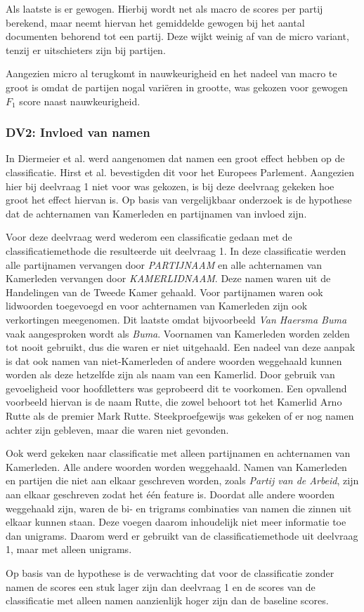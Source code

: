 Als laatste is er gewogen. Hierbij wordt net als macro de scores per partij berekend, maar neemt hiervan het gemiddelde gewogen bij het aantal documenten behorend tot een partij. Deze wijkt weinig af van de micro variant, tenzij er uitschieters zijn bij partijen.\par
Aangezien micro al terugkomt in nauwkeurigheid en het nadeel van macro te groot is omdat de partijen nogal variëren in grootte, was gekozen voor gewogen $F_1$ score naast nauwkeurigheid.

\subsubsection{DV2: Invloed van namen}
In Diermeier et al. \cite{diermeier_godbout_yu_kaufmann_2012} werd aangenomen dat namen een groot effect hebben op de classificatie. Hirst et al. \cite{Hirst_textto} bevestigden dit voor het Europees Parlement. Aangezien hier bij deelvraag 1 niet voor was gekozen, is bij deze deelvraag gekeken hoe groot het effect hiervan is. Op basis van vergelijkbaar onderzoek is de hypothese dat de achternamen van Kamerleden en partijnamen van invloed zijn.\par
Voor deze deelvraag werd wederom een classificatie gedaan met de classificatiemethode die resulteerde uit deelvraag 1. In deze classificatie werden alle partijnamen vervangen door \textit{PARTIJNAAM} en alle achternamen van Kamerleden vervangen door \textit{KAMERLIDNAAM}. Deze namen waren uit de Handelingen van de Tweede Kamer gehaald. Voor partijnamen waren ook lidwoorden toegevoegd en voor achternamen van Kamerleden zijn ook verkortingen meegenomen. Dit laatste omdat bijvoorbeeld \textit{Van Haersma Buma} vaak aangesproken wordt als \textit{Buma}. Voornamen van Kamerleden worden zelden tot nooit gebruikt, dus die waren er niet uitgehaald. Een nadeel van deze aanpak is dat ook namen van niet-Kamerleden of andere woorden weggehaald kunnen worden als deze hetzelfde zijn als naam van een Kamerlid. Door gebruik van gevoeligheid voor hoofdletters was geprobeerd dit te voorkomen. Een opvallend voorbeeld hiervan is de naam Rutte, die zowel behoort tot het Kamerlid Arno Rutte als de premier Mark Rutte. Steekproefgewijs was gekeken of er nog namen achter zijn gebleven, maar die waren niet gevonden. \par
Ook werd gekeken naar classificatie met alleen partijnamen en achternamen van Kamerleden. Alle andere woorden worden weggehaald. Namen van Kamerleden en partijen die niet aan elkaar geschreven worden, zoals \textit{Partij van de Arbeid}, zijn aan elkaar geschreven zodat het één feature is. Doordat alle andere woorden weggehaald zijn, waren de bi- en trigrams combinaties van namen die zinnen uit elkaar kunnen staan. Deze voegen daarom inhoudelijk niet meer informatie toe dan unigrams. Daarom werd er gebruikt van de classificatiemethode uit deelvraag 1, maar met alleen unigrams.\par
Op basis van de hypothese is de verwachting dat voor de classificatie zonder namen de scores een stuk lager zijn dan deelvraag 1 en de scores van de classificatie met alleen namen aanzienlijk hoger zijn dan de baseline scores.

